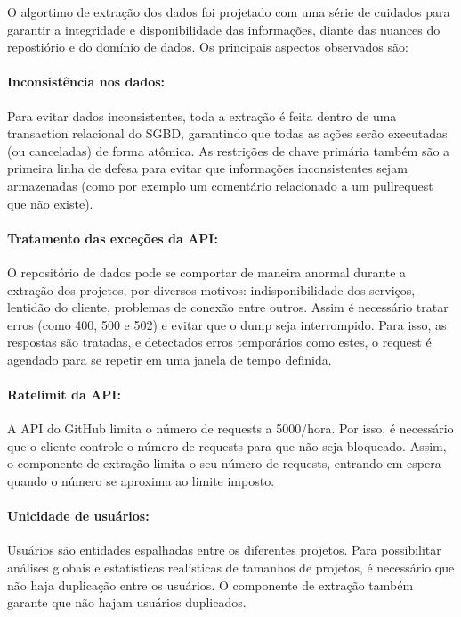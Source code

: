 \documentclass[a4paper,12pt]{monografia}
\theoremstyle{plain}
\theoremstyle{definition}
\theoremstyle{remark}
\begin{document}
O algortimo de extração dos dados foi projetado com uma série de cuidados para garantir a integridade e disponibilidade das informações, diante das nuances do repostiório e do domínio de dados. Os principais aspectos observados são:

\paragraph{Inconsistência nos dados: } Para evitar dados inconsistentes, toda a extração é feita dentro de uma transaction relacional do SGBD, garantindo que todas as ações serão executadas (ou canceladas) de forma atômica. As restrições de chave primária também são a primeira linha de defesa para evitar que informações inconsistentes sejam armazenadas (como por exemplo um comentário relacionado a um pullrequest que não existe).

\paragraph{Tratamento das exceções da API: } O repositório de dados pode se comportar de maneira anormal durante a extração dos projetos, por diversos motivos: indisponibilidade dos serviços, lentidão do cliente, problemas de conexão entre outros. Assim é necessário tratar erros (como 400, 500 e 502) e evitar que o dump seja interrompido. Para isso, as respostas são tratadas, e detectados erros temporários como estes, o request é agendado para se repetir em uma janela de tempo definida.

\paragraph{Ratelimit da API: } A API do GitHub limita o número de requests a 5000/hora. Por isso, é necessário que o cliente controle o número de requests para que não seja bloqueado. Assim, o componente de extração limita o seu número de requests, entrando em espera quando o número se aproxima ao limite imposto.

\paragraph{Unicidade de usuários: } Usuários são entidades espalhadas entre os diferentes projetos. Para possibilitar análises globais e estatísticas realísticas de tamanhos de projetos, é necessário que não haja duplicação entre os usuários. O componente de extração também garante que não hajam usuários duplicados.
\end{document}
